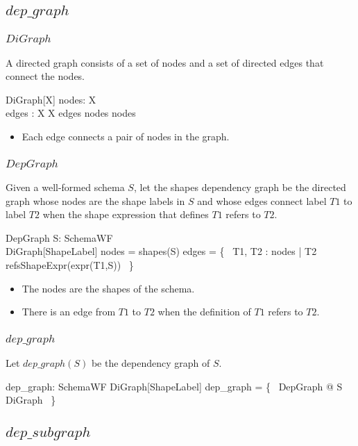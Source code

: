 \documentclass{article}
\begin{document}
\subsection{$dep\_graph$}

\subsubsection{$DiGraph$}
A directed graph consists of a set of nodes and a set of directed edges that connect the nodes.
\begin{schema}{DiGraph}[X]
	nodes: \power X \\
	edges : X \rel X
\where
	edges \in nodes \rel nodes
\end{schema}
\begin{itemize}
\item Each edge connects a pair of nodes in the graph.
\end{itemize}

\subsubsection{$DepGraph$}
Given a well-formed schema $S$, let the shapes dependency graph be the directed graph 
whose nodes are the shape labels in $S$ and whose edges connect label $T1$ to label $T2$ when the shape expression 
that defines $T1$ refers to $T2$.\begin{schema}{DepGraph}
	S: SchemaWF \\
	DiGraph[ShapeLabel]
\where
	nodes = shapes(S)
\also
	edges =  \{~ T1, T2 : nodes | T2 \in refsShapeExpr(expr(T1,S)) ~\}
\end{schema}
\begin{itemize}
\item The nodes are the shapes of the schema.
\item There is an edge from $T1$ to $T2$ when the definition of $T1$ refers to $T2$.
\end{itemize}


\subsubsection{$dep\_graph$}
Let $dep\_graph(S)$ be the dependency graph of $S$.
\begin{axdef}
	dep\_graph: SchemaWF \fun DiGraph[ShapeLabel]
\where
	dep\_graph = \{~ DepGraph @ S \mapsto \theta DiGraph ~\}
\end{axdef}

\subsection{$dep\_subgraph$}
\end{document}
